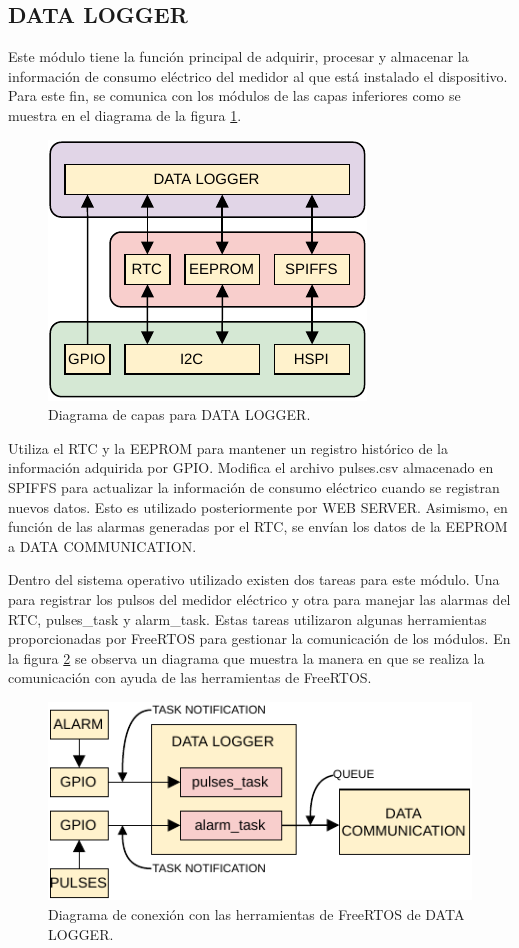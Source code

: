 \subsection{DATA LOGGER}

Este módulo tiene la función principal de adquirir, procesar y almacenar la información de consumo eléctrico del medidor al que está instalado el dispositivo. Para este fin, se comunica con los módulos de las capas inferiores como se muestra en el diagrama de la figura \ref{fig:dataLayers}.

\begin{figure}[h]
	\centering
	\includegraphics[scale=1]{./Figures/data_logger_diagram.pdf}
	\caption{Diagrama de capas para DATA LOGGER.}
		\label{fig:dataLayers}
\end{figure}

Utiliza el RTC y la EEPROM para mantener un registro histórico de la información adquirida por GPIO. Modifica el archivo pulses.csv almacenado en SPIFFS para actualizar la información de consumo eléctrico cuando se registran nuevos datos. Esto es utilizado posteriormente por WEB SERVER. Asimismo, en función de las alarmas generadas por el RTC, se envían los datos de la EEPROM a DATA COMMUNICATION.

Dentro del sistema operativo utilizado existen dos tareas para este módulo. Una para registrar los pulsos del medidor eléctrico y otra para manejar las alarmas del RTC, pulses\_task y alarm\_task. Estas tareas utilizaron algunas herramientas proporcionadas por FreeRTOS para gestionar la comunicación de los módulos. En la figura \ref{fig:dataRTOS} se observa un diagrama que muestra la manera en que se realiza la comunicación con ayuda de las herramientas de FreeRTOS.

\begin{figure}[h]
	\centering
	\includegraphics[scale=1]{./Figures/data_logger_com.pdf}
	\caption{Diagrama de conexión con las herramientas de FreeRTOS de DATA LOGGER.}
		\label{fig:dataRTOS}
\end{figure}

